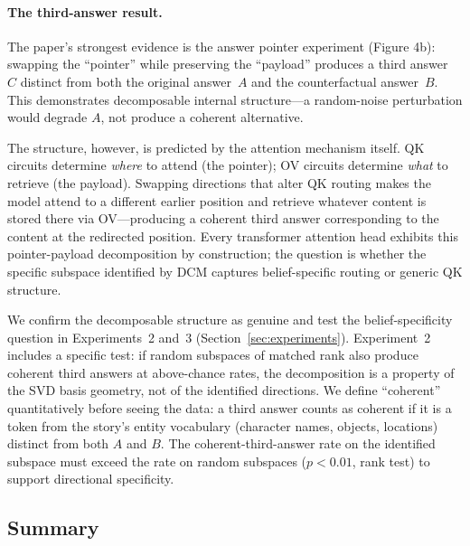 \documentclass{article}
\begin{document}
\paragraph{The third-answer result.}
The paper's strongest evidence is the answer pointer experiment (Figure 4b): swapping the ``pointer'' while preserving the ``payload'' produces a third answer~$C$ distinct from both the original answer~$A$ and the counterfactual answer~$B$. This demonstrates decomposable internal structure---a random-noise perturbation would degrade $A$, not produce a coherent alternative.

The structure, however, is predicted by the attention mechanism itself. QK circuits determine \emph{where} to attend (the pointer); OV circuits determine \emph{what} to retrieve (the payload). Swapping directions that alter QK routing makes the model attend to a different earlier position and retrieve whatever content is stored there via OV---producing a coherent third answer corresponding to the content at the redirected position. Every transformer attention head exhibits this pointer-payload decomposition by construction; the question is whether the specific subspace identified by DCM captures belief-specific routing or generic QK structure.

We confirm the decomposable structure as genuine and test the belief-specificity question in Experiments~2 and~3 (Section~\ref{sec:experiments}). Experiment~2 includes a specific test: if random subspaces of matched rank also produce coherent third answers at above-chance rates, the decomposition is a property of the SVD basis geometry, not of the identified directions. We define ``coherent'' quantitatively before seeing the data: a third answer counts as coherent if it is a token from the story's entity vocabulary (character names, objects, locations) distinct from both $A$ and $B$. The coherent-third-answer rate on the identified subspace must exceed the rate on random subspaces ($p < 0.01$, rank test) to support directional specificity.

\subsection{Summary}
\end{document}
